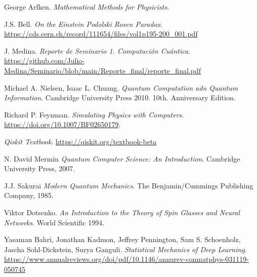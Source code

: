 \documentclass[a4paper]{article}
\begin{document}
\begin{thebibliography}{99}
 George Arfken. \textit{Mathematical Methods for Physicists}.

 J.S. Bell. \textit{On the Einstein Podolski Rosen Paradox}. \url{https://cds.cern.ch/record/111654/files/vol1p195-200_001.pdf}

 J. Medina. \textit{Reporte de Seminario 1. Computación Cuántica}. \url{https://github.com/Julio-Medina/Seminario/blob/main/Reporte_final/reporte_final.pdf}

 Michael A. Nielsen, Isaac L. Chuang. \textit{Quantum Computation adn Quantum Information}. Cambridge University Press 2010. 10th. Anniversary Edition.

 Richard P. Feynman. \textit{Simulating Physics with Computers.} \url{https://doi.org/10.1007/BF02650179}.

 \textit{Qiskit Textbook}. \url{https://qiskit.org/textbook-beta}

 N. David Mermin \textit{Quantum Computer Science: An Introduction}. Cambridge University Press, 2007.

 J.J. Sakurai \textit{Modern Quantum Mechanics}. The Benjamin/Cummings Publishing Company, 1985.

 Viktor Dotsenko. \textit{An Introduction to the Theory of Spin Glasses and Neural Networks}. World Scientific 1994.

 Yasaman Bahri, Jonathan Kadmon, Jeffrey Pennington, Sam S. Schoenholz, Jascha Sohl-Dickstein, Surya Ganguli. \textit{Statistical Mechanics of Deep Learning}. \url{https://www.annualreviews.org/doi/pdf/10.1146/annurev-conmatphys-031119-050745}


\end{thebibliography}
\end{document}
